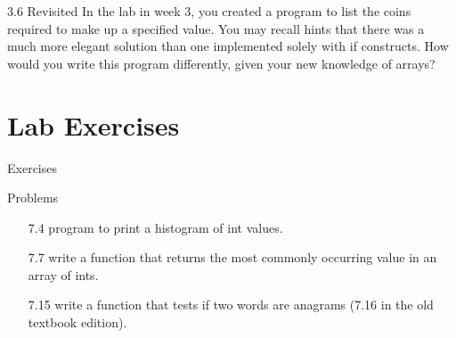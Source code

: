 \documentclass{beamer}
\begin{document}
\begin{frame}{3.6 Revisited}
    In the lab in week 3, you created a program to list the
    coins required to make up a specified value. You may recall hints that
    there was a much more elegant solution than one implemented solely with
    if constructs. How would you write this program differently, given your 
    new knowledge of arrays?
\end{frame}

\section{Lab Exercises}

\begin{frame}{Exercises}
    \begin{block}{Problems}
        \begin{itemize}
            \item[7.4] program to print a histogram of int values.
            \item[7.7] write a function that returns the most commonly
                occurring value in an array of ints.
            \item[7.15] write a function that tests if two words are
                anagrams (7.16 in the old textbook edition).
        \end{itemize}
    \end{block}
\end{frame}

%
%
\end{document}
